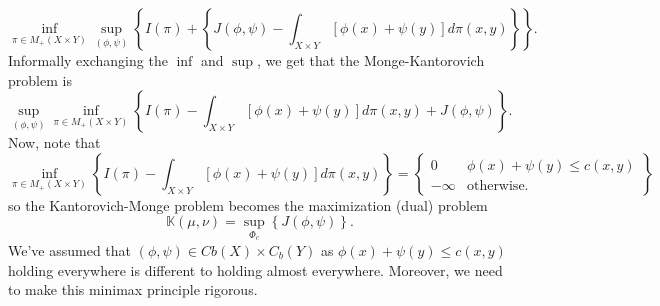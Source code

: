 \documentclass[12pt]{article}
\theoremstyle{plain}
\numberwithin{equation}{section}
\begin{document}
\begin{equation}
  \inf_{\pi\in M_+(X\times Y)}\sup_{(\phi,\psi)}\left\{I(\pi)+\left\{J(\phi,\psi)- \int_{X\times Y} [\phi(x)+\psi(y)]d\pi(x,y)\right\}\right\}.
\end{equation}
Informally exchanging the $\inf$ and $\sup$, we get that the Monge-Kantorovich problem is 
\begin{equation}\label{eqn:swap}
  \sup_{(\phi,\psi)}\inf_{\pi\in M_+(X\times Y)}\left\{I(\pi) - \int_{X\times Y}[\phi(x) +\psi(y)]d\pi(x,y)+J(\phi,\psi)\right\}.
\end{equation}
Now, note that 
\[ \inf_{\pi\in M_+(X\times Y)}\left\{I(\pi) - \int_{X\times Y}[\phi(x) + \psi(y)]d\pi(x,y)\right\} = \left\{\begin{matrix}0 &\phi(x) + \psi(y) \le c(x,y) \\ -\infty &\text{otherwise.}\end{matrix}\right\}\]
so the Kantorovich-Monge problem becomes the maximization (dual) problem
\begin{equation}
  \mathbb{K}(\mu,\nu) = \sup_{\Phi_c}\left\{J(\phi,\psi)\right\}.
\end{equation}
We've assumed that $(\phi,\psi) \in Cb(X)\times C_b(Y)$ as $\phi(x)+\psi(y) \le c(x,y)$ holding everywhere is different to holding almost everywhere. Moreover, we need to make this minimax principle rigorous.
\end{document}
